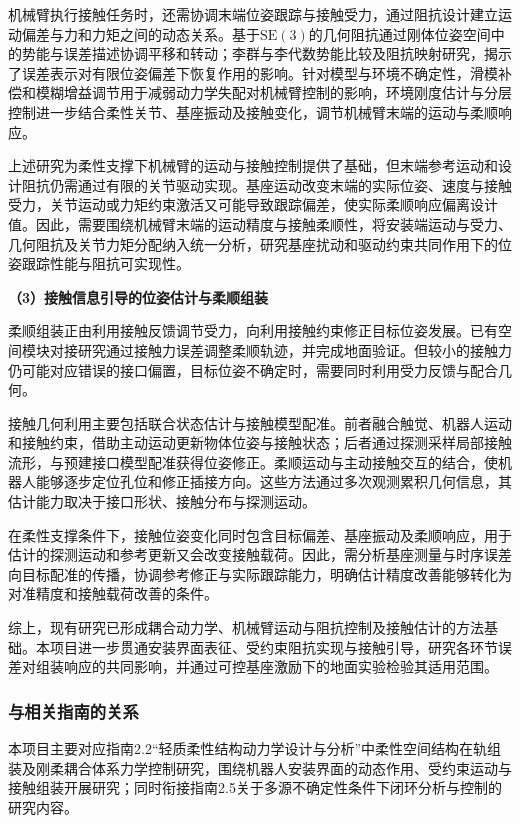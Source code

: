 \documentclass[UTF8,a4paper,zihao=-4,fontset=fandol]{ctexart}
\newcommand{\topic}[1]{\par\Needspace{4\baselineskip}\addvspace{0.5em}\noindent\textbf{#1}\par\nobreak}
\newcommand{\SE}{\mathrm{SE}(3)}
\begin{document}
机械臂执行接触任务时，还需协调末端位姿跟踪与接触受力，通过阻抗设计建立运动偏差与力和力矩之间的动态关系。基于$\SE$的几何阻抗通过刚体位姿空间中的势能与误差描述协调平移和转动\cite{seo2023}；李群与李代数势能比较及阻抗映射研究，揭示了误差表示对有限位姿偏差下恢复作用的影响\cite{seo2024,kim2025}。针对模型与环境不确定性，滑模补偿和模糊增益调节用于减弱动力学失配对机械臂控制的影响\cite{liudb2024}，环境刚度估计与分层控制进一步结合柔性关节、基座振动及接触变化，调节机械臂末端的运动与柔顺响应\cite{liuadaptive2026}。

上述研究为柔性支撑下机械臂的运动与接触控制提供了基础，但末端参考运动和设计阻抗仍需通过有限的关节驱动实现。基座运动改变末端的实际位姿、速度与接触受力，关节运动或力矩约束激活又可能导致跟踪偏差，使实际柔顺响应偏离设计值。因此，需要围绕机械臂末端的运动精度与接触柔顺性，将安装端运动与受力、几何阻抗及关节力矩分配纳入统一分析，研究基座扰动和驱动约束共同作用下的位姿跟踪性能与阻抗可实现性。

\topic{（3）接触信息引导的位姿估计与柔顺组装}

柔顺组装正由利用接触反馈调节受力，向利用接触约束修正目标位姿发展。已有空间模块对接研究通过接触力误差调整柔顺轨迹，并完成地面验证\cite{shi2024}。但较小的接触力仍可能对应错误的接口偏置，目标位姿不确定时，需要同时利用受力反馈与配合几何。

接触几何利用主要包括联合状态估计与接触模型配准。前者融合触觉、机器人运动和接触约束，借助主动运动更新物体位姿与接触状态\cite{kimtactile2023}；后者通过探测采样局部接触流形，与预建接口模型配准获得位姿修正\cite{negi2025}。柔顺运动与主动接触交互的结合，使机器人能够逐步定位孔位和修正插接方向\cite{chen2025}。这些方法通过多次观测累积几何信息，其估计能力取决于接口形状、接触分布与探测运动。

在柔性支撑条件下，接触位姿变化同时包含目标偏差、基座振动及柔顺响应，用于估计的探测运动和参考更新又会改变接触载荷。因此，需分析基座测量与时序误差向目标配准的传播，协调参考修正与实际跟踪能力，明确估计精度改善能够转化为对准精度和接触载荷改善的条件。

综上，现有研究已形成耦合动力学、机械臂运动与阻抗控制及接触估计的方法基础。本项目进一步贯通安装界面表征、受约束阻抗实现与接触引导，研究各环节误差对组装响应的共同影响，并通过可控基座激励下的地面实验检验其适用范围。

\subsubsection{与相关指南的关系}

本项目主要对应指南2.2“轻质柔性结构动力学设计与分析”中柔性空间结构在轨组装及刚柔耦合体系力学控制研究，围绕机器人安装界面的动态作用、受约束运动与接触组装开展研究；同时衔接指南2.5关于多源不确定性条件下闭环分析与控制的研究内容。
\begingroup
\small
{}
\setlength{\parskip}{0pt}
\end{document}
